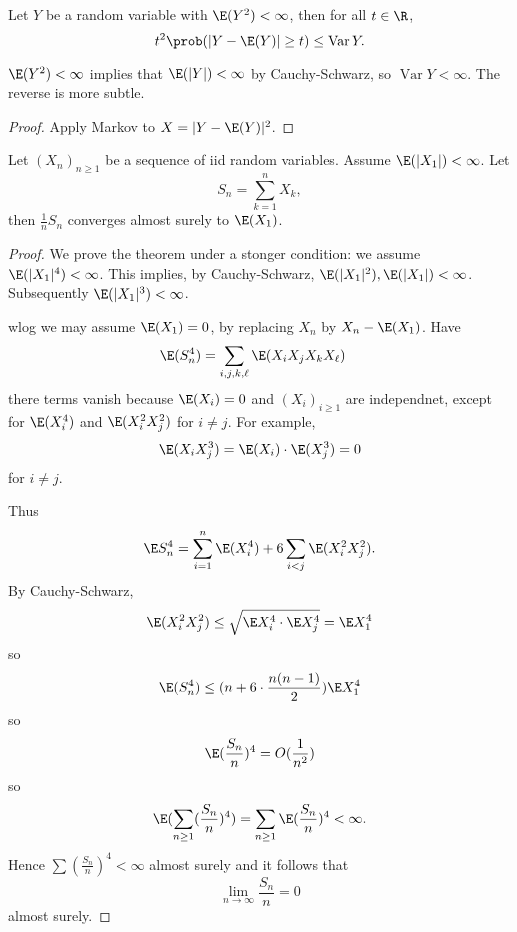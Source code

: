 \documentclass[a4paper]{article}
\renewcommand{\P}{\prob} %
\DeclareMathOperator{\var}{Var} %
\begin{document}
\begin{proposition}[Chebyshev]
  Let \(Y\) be a random variable with \(\E(Y^2) < \infty\), then for all \(t \in \R\),
  \[
    t^2 \P(|Y - \E(Y)| \geq t) \leq \var Y.
  \]
\end{proposition}

\(\E(Y^2) < \infty\) implies that \(\E(|Y|) < \infty\) by Cauchy-Schwarz, so \(\var Y < \infty\). The reverse is more subtle.

\begin{proof}
  Apply Markov to \(X = |Y - \E(Y)|^2\).
\end{proof}

\begin{theorem}
  Let \((X_n)_{n \geq 1}\) be a sequence of iid random variables. Assume \(\E(|X_1|) < \infty\). Let
  \[
    S_n = \sum_{k = 1}^n X_k,
  \]
  then \(\frac{1}{n} S_n\) converges almost surely to \(\E(X_1)\).
\end{theorem}

\begin{proof}
  We prove the theorem under a stonger condition: we assume \(\E(|X_1|^4) < \infty\). This implies, by Cauchy-Schwarz, \(\E(|X_1|^2), \E(|X_1|) < \infty\). Subsequently \(\E(|X_1|^3) < \infty\).

  wlog we may assume \(\E(X_1) = 0\), by replacing \(X_n\) by \(X_n - \E(X_1)\). Have
  \begin{align*}
    \E(S_n^4)
    &= \sum_{i,j, k, \ell} \E(X_iX_jX_kX_\ell)
  \end{align*}
  there terms vanish because \(\E(X_i) = 0\) and \((X_i)_{i \geq 1}\) are independnet, except for \(\E(X_i^4)\) and \(\E(X_i^2X_j^2)\) for \(i \neq j\). For example,
  \[
    \E(X_iX_j^3) = \E(X_i) \cdot \E(X_j^3) = 0
  \]
  for \(i \neq j\).

  Thus
  \[
    \E S_n^4 = \sum_{i = 1}^n \E (X_i^4) + 6 \sum_{i < j} \E(X_i^2 X_j^2).
  \]
  By Cauchy-Schwarz,
  \[
    \E(X_i^2X_j^2) \leq \sqrt{\E X_i^4 \cdot \E X_j^4} = \E X_1^4
  \]
  so
  \[
    \E(S_n^4) \leq (n + 6 \cdot \frac{n(n - 1)}{2}) \E X_1^4
  \]
  so
  \[
    \E (\frac{S_n}{n})^4 = O(\frac{1}{n^2})
  \]
  so
  \[
    \E (\sum_{n \geq 1} (\frac{S_n}{n})^4) = \sum_{n \geq 1} \E(\frac{S_n}{n})^4 < \infty.
  \]
  Hence \(\sum (\frac{S_n}{n})^4 < \infty\) almost surely and it follows that
  \[
    \lim_{n \to \infty} \frac{S_n}{n} = 0
  \]
  almost surely.
\end{proof}
\end{document}
